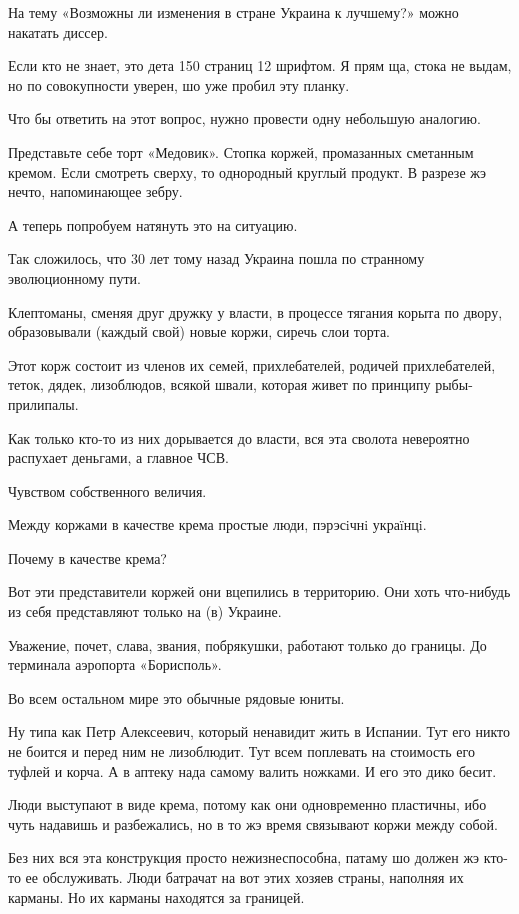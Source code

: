 \begin{multicols}{2}
На тему «Возможны ли изменения в стране Украина к лучшему?» можно накатать
диссер.

Если кто не знает, это дета 150 страниц 12 шрифтом. Я прям ща, стока не выдам,
но по совокупности уверен, шо уже пробил эту планку.

Что бы ответить на этот вопрос, нужно провести одну небольшую аналогию.

Представьте себе торт «Медовик». Стопка коржей, промазанных сметанным кремом.
Если смотреть сверху, то однородный круглый продукт. В разрезе жэ нечто,
напоминающее зебру.

А теперь попробуем натянуть это на ситуацию.

Так сложилось, что 30 лет тому назад Украина пошла по странному эволюционному
пути.

Клептоманы, сменяя друг дружку у власти, в процессе тягания корыта по двору,
образовывали (каждый свой) новые коржи, сиречь слои торта.

Этот корж состоит из членов их семей, прихлебателей, родичей прихлебателей,
теток, дядек, лизоблюдов, всякой швали, которая живет по принципу
рыбы-прилипалы.

Как только кто-то из них дорывается до власти, вся эта сволота невероятно
распухает деньгами, а главное ЧСВ.

Чувством собственного величия.

Между коржами в качестве крема простые люди, пэрэсiчнi украïнцi.

Почему в качестве крема?

Вот эти представители коржей они вцепились в территорию. Они хоть что-нибудь из
себя представляют только на (в) Украине.

Уважение, почет, слава, звания, побрякушки, работают только до границы. До
терминала аэропорта «Борисполь».

Во всем остальном мире это обычные рядовые юниты.

Ну типа как Петр Алексеевич, который ненавидит жить в Испании. Тут его никто не
боится и перед ним не лизоблюдит. Тут всем поплевать на стоимость его туфлей и
корча. А в аптеку нада самому валить ножками. И его это дико бесит.

Люди выступают в виде крема, потому как они одновременно пластичны, ибо чуть
надавишь и разбежались, но в то жэ время связывают коржи между собой.

Без них вся эта конструкция просто нежизнеспособна, патаму шо должен жэ кто-то
ее обслуживать. Люди батрачат на вот этих хозяев страны, наполняя их карманы.
Но их карманы находятся за границей.


\end{multicols}
